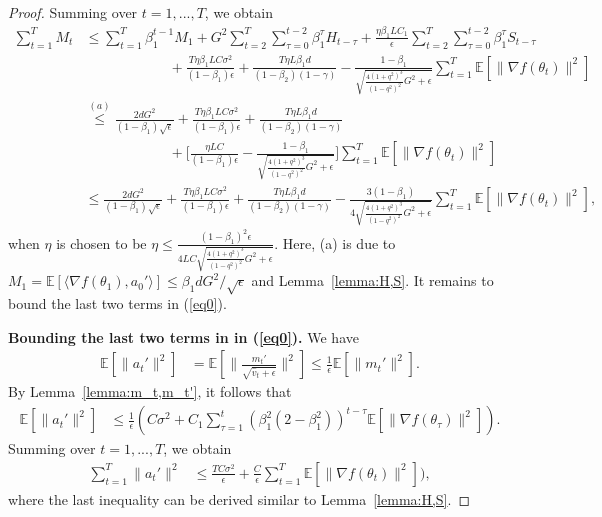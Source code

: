 \documentclass[11pt]{article}
\begin{document}
\begin{proof}
Summing over $t=1,...,T$, we obtain
\begin{align*}
    \sum_{t=1}^T M_t&\leq \sum_{t=1}^T \beta_1^{t-1} M_1+G^2\sum_{t=2}^T \sum_{\tau=0}^{t-2} \beta_1^\tau H_{t-\tau}+\frac{\eta \beta_1 LC_1}{\epsilon}\sum_{t=2}^T\sum_{\tau=0}^{t-2}\beta_1^\tau S_{t-\tau}\\
    &\hspace{1in} +\frac{T\eta \beta_1 LC\sigma^2}{(1-\beta_1)\epsilon}+\frac{T\eta L\beta_1 d}{(1-\beta_2)(1-\gamma)}-\frac{1-\beta_1}{\sqrt{\frac{4(1+q^2)^3}{(1-q^2)^2}G^2+\epsilon}}\sum_{t=1}^T \mathbb E[\|\nabla f(\theta_t)\|^2]\\
    &\overset{(a)}{\leq} \frac{2dG^2}{(1-\beta_1)\sqrt\epsilon}+\frac{T\eta \beta_1 LC\sigma^2}{(1-\beta_1)\epsilon}+\frac{T\eta L\beta_1 d}{(1-\beta_2)(1-\gamma)}\\
    &\hspace{1in} +\Big[\frac{\eta L C}{(1-\beta_1)\epsilon}- \frac{1-\beta_1}{\sqrt{\frac{4(1+q^2)^3}{(1-q^2)^2}G^2+\epsilon}}\Big]\sum_{t=1}^T \mathbb E[\|\nabla f(\theta_t)\|^2]\\
    &\leq \frac{2dG^2}{(1-\beta_1)\sqrt\epsilon}+\frac{T\eta \beta_1 LC\sigma^2}{(1-\beta_1)\epsilon}+\frac{T\eta L\beta_1 d}{(1-\beta_2)(1-\gamma)}- \frac{3(1-\beta_1)}{4\sqrt{\frac{4(1+q^2)^3}{(1-q^2)^2}G^2+\epsilon}}\sum_{t=1}^T \mathbb E[\|\nabla f(\theta_t)\|^2],
\end{align*}
when $\eta$ is chosen to be $\eta\leq\frac{(1-\beta_1)^2\epsilon}{4LC\sqrt{\frac{4(1+q^2)^3}{(1-q^2)^2}G^2+\epsilon}}$. Here, (a) is due to $M_1=\mathbb E[\langle\nabla f(\theta_1),a_0'\rangle]\leq \beta_1 d G^2/\sqrt{\epsilon}$ and Lemma~\ref{lemma:H,S}. It remains to bound the last two terms in (\ref{eq0}).

\textbf{Bounding the last two terms in  in (\ref{eq0}).} We have
\begin{align*}
    \mathbb E[\|a_t'\|^2]&=\mathbb E[\|\frac{m_t'}{\sqrt{\hat v_t+\epsilon}}\|^2]\leq \frac{1}{\epsilon}\mathbb E[\|m_t'\|^2].
\end{align*}
By Lemma~\ref{lemma:m_t,m_t'}, it follows that
\begin{align*}
    \mathbb E[\|a_t'\|^2]&\leq \frac{1}{\epsilon}(C\sigma^2+C_1 \sum_{\tau=1}^t (\beta_1^2(2-\beta_1^2))^{t-\tau}\mathbb E[\|\nabla f(\theta_\tau)\|^2]).
\end{align*}
Summing over $t=1,...,T$, we obtain
\begin{align*}
    \sum_{t=1}^T \|a_t'\|^2&\leq \frac{TC\sigma^2}{\epsilon}+\frac{C}{\epsilon} \sum_{t=1}^T \mathbb E[\|\nabla f(\theta_t)\|^2]),
\end{align*}
where the last inequality can be derived similar to Lemma~\ref{lemma:H,S}.


\end{proof}
\end{document}
